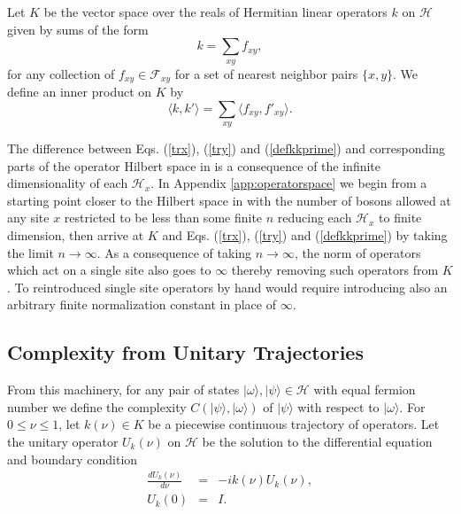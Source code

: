 \documentclass[12pt,amsmath,amssymb,onecolumn]{revtex4-2}
\begin{document}
Let $K$ be the vector space over the reals of Hermitian linear
operators $k$ on $\mathcal{H}$
given by sums of the form
\begin{equation}
\label{defk}
k = \sum_{x y} f_{x y},
\end{equation}
for any collection of 
$f_{x y} \in \mathcal{F}_{x y}$ for a set of nearest neighbor pairs $\{x, y\}$.
We define an inner product on $K$
by
\begin{equation}
\label{defkkprime}
 \langle  k, k' \rangle   =  \sum_{xy}  \langle  f_{xy}, f'_{xy} \rangle .
\end{equation}

The difference between Eqs. (\ref{trx}), (\ref{try}) and (\ref{defkkprime})
and corresponding parts of the operator Hilbert space in \cite{Nielsen}
is a consequence of the infinite dimensionality of each $\mathcal{H}_x$.
In Appendix \ref{app:operatorspace} we begin from
a starting point closer to the Hilbert space in \cite{Nielsen}
with the number of bosons allowed at any site $x$
restricted to be less than some finite $n$ reducing each $\mathcal{H}_x$ to
finite dimension, then arrive at $K$
and  Eqs. (\ref{trx}), (\ref{try}) and (\ref{defkkprime})
by taking the limit $n \rightarrow \infty$.
As a consequence of taking $n \rightarrow \infty$,
the norm of operators which act on a single site
also goes to $\infty$ thereby removing such 
operators from $K$.
To reintroduced single site operators by hand
would require
introducing also an
arbitrary finite normalization constant
in place of $\infty$.




\subsection{\label{subsec:complexitydef} Complexity from Unitary Trajectories}

From this machinery, for any pair of states $| \omega \rangle , |\psi \rangle  \in \mathcal{H}$ with equal
fermion number we define 
the complexity $C(|\psi \rangle , |\omega \rangle )$ of $|\psi \rangle $ with
respect to $|\omega \rangle $. 
For $0 \leq \nu \leq 1$, let $k( \nu) \in K$ be a piecewise continuous trajectory of operators.
Let the unitary operator $U_k(\nu)$ on $\mathcal{H}$ be the solution to the differential
equation and boundary condition
\begin{subequations}
\begin{eqnarray}
\label{udot}
\frac{dU_k(\nu)}{d \nu} & = &-i k( \nu) U_k( \nu), \\
\label{uboundary0}
U_k( 0) & = & I.
\end{eqnarray}
\end{subequations}
\end{document}
